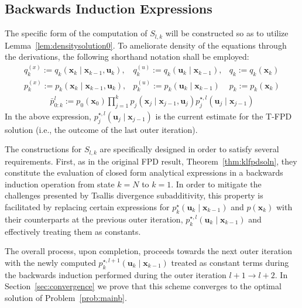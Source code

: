 \documentclass[a4paper,fleqn]{cas-sc}
\newcommand{\bv}[1]{\mathbf{#1}}
\newcommand{\plant}[2]{p_{{#1}} \left(\bv{x}_{{#1}}\mid \bv{x}_{{#2}}, \bv{u}_{{#1}} \right)}
\newcommand{\policy}[2]{p_{{#1}}\left(\bv{u}_{{#1}}\mid \bv{x}_{{#2}} \right)}
\newcommand{\optimalpolicy}[2]{p^{\star}_{{#1}} \left(\bv{u}_{{#1}}\mid \bv{x}_{{#2}} \right)}
\newcommand{\optimalpolicygen}[3]{p^{\star,{#3}}_{{#1}} \left(\bv{u}_{{#1}}\mid \bv{x}_{{#2}} \right)}
\newcommand{\refplant}[2]{q_{{#1}} \left(\bv{x}_{{#1}}\mid \bv{x}_{{#2}}, \bv{u}_{{#1}} \right)}
\newcommand{\refpolicy}[2]{q_{{#1}}\left(\bv{u}_{{#1}}\mid \bv{x}_{{#2}} \right)}
\begin{document}
\subsection{Backwards Induction Expressions}\label{sec:expressions}

The specific form of the computation of $S_{l,k}$ will be constructed so as to utilize Lemma~\ref{lem:densitysolution0}. To ameliorate density of the equations through the derivations, the following shorthand notation shall be employed:
\[
\begin{array}{lll}
q^{(x)}_k:= \refplant{k}{k-1},&
q^{(u)}_k:= \refpolicy{k}{k-1}, & q_k:=q_k(\bv{x}_k) \\
p^{(x)}_k:=\plant{k}{k-1}, & p^{(u)}_k := \policy{k}{k-1} & p_k:=p_k(\bv{x}_k)
\end{array}
\]
\[
\begin{array}{l}
\bar{p}^l_{0:k}:= p_{0}\left(\bv{x}_0\right)\prod_{j=1}^{k} \plant{j}{j-1}\optimalpolicygen{j}{j-1}{l}  
\end{array}
\]
In the above expression, $\optimalpolicygen{j}{j-1}{l} $ is the current estimate for the T-FPD solution (i.e., the outcome of the last outer iteration). 

The constructions for $S_{l,k}$ are specifically designed in order to satisfy several requirements. First, as in the original FPD result, Theorem~\ref{thm:klfpdsoln}, they constitute the evaluation of closed form analytical expressions in a backwards induction operation from state $k=N$ to $k=1$. In order to mitigate the challenges presented by Tsallis divergence subadditivity, this property is facilitated by replacing certain expressions for $\optimalpolicy{k}{k-1}$ and $p(\bv{x}_k)$ with their counterparts at the previous outer iteration, $\optimalpolicygen{k}{k-1}{l}$ and effectively treating them as constants. 

The overall process, upon completion, proceeds towards the next outer iteration with the newly computed $\optimalpolicygen{k}{k-1}{l+1}$ treated as constant terms during the backwards induction performed during the outer iteration $l+1\to l+2$. In Section~\ref{sec:convergence} we prove that this scheme converges to the optimal solution of Problem~\ref{prob:mainb}.
\end{document}
